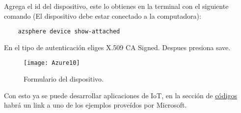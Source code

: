 \pagebreak
Agrega el id del dispositivo, este lo obtienes en la terminal con el siguiente comando (El dispositivo debe estar conectado a la computadora):
\begin{verbatim}
	azsphere device show-attached
\end{verbatim}
En el tipo de autenticación eliges X.509 CA Signed. Despues presiona save.
\begin{figure}[h]
	\centering
	\texttt{[image: Azure10]}
	\caption{Formulario del dispositivo.}
\end{figure}

Con esto ya se puede desarrollar aplicaciones de IoT, en la sección de \hyperref[sec:codigos]{códigos} habrá un link a uno de los ejemplos proveídos por Microsoft.